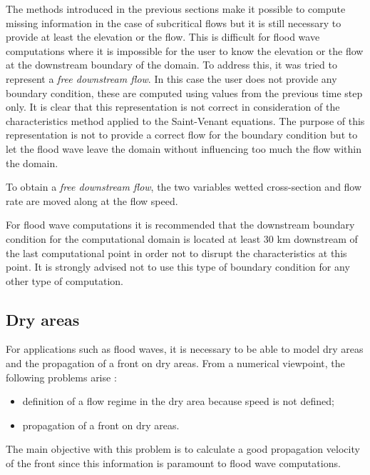 The methods introduced in the previous sections make it possible to compute missing information in the case of subcritical flows but it is still necessary to provide at least the elevation or the flow. This is difficult for flood wave computations where it is impossible for the user to know the elevation or the flow at the downstream boundary of the domain. To address this, it was tried to represent a \textit{free downstream flow}. In this case the user does not provide any boundary condition, these are computed using values from the previous time step only. It is clear that this representation is not correct in consideration of the characteristics method applied to the Saint-Venant equations. The purpose of this representation is not to provide a correct flow for the boundary condition but to let the flood wave leave the domain without influencing too much the flow within the domain.

To obtain a \textit{free downstream flow}, the two variables wetted cross-section and flow rate are moved along at the flow speed.

For flood wave computations it is recommended that the downstream boundary condition for the computational domain is located at least 30 km downstream of the last computational point in order not to disrupt the characteristics at this point. It is strongly advised not to use this type of boundary condition for any other type of computation.

\subsection{Dry areas}

For applications such as flood waves, it is necessary to be able to model dry areas and the propagation of a front on dry areas. From a numerical viewpoint, the following problems arise :
\begin{itemize}
 \item definition of a flow regime in the dry area because speed is not defined;
 \item propagation of a front on dry areas.
\end{itemize}

The main objective with this problem is to calculate a good propagation velocity of the front since this information is paramount to flood wave computations.

